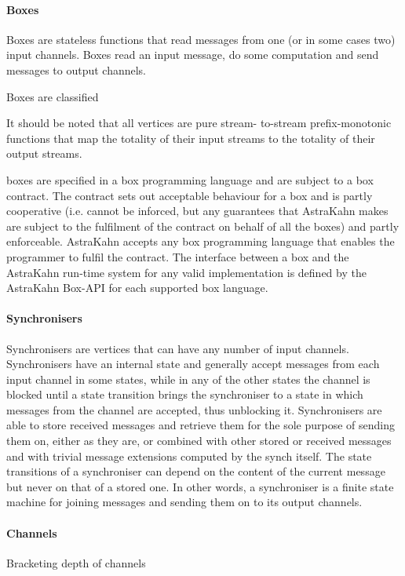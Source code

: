 \paragraph{Boxes}
Boxes are stateless functions that read messages from one (or in some cases two) input channels. Boxes read an input message, do some computation and send messages to output channels.

Boxes are classified

It should be noted that all vertices are pure stream- to-stream prefix-monotonic functions that map the totality of their input streams to the totality of their output streams.

boxes are specified in a
box programming language and are subject to a box contract. The contract sets out acceptable behaviour for a box and is partly cooperative (i.e. cannot be inforced, but any guarantees that AstraKahn makes are subject to the fulfilment of the contract on behalf of all the boxes) and partly enforceable. AstraKahn accepts any box programming language that enables the programmer to fulfil the contract. The interface between a box and the AstraKahn run-time system for any valid implementation is defined by the AstraKahn Box-API for each supported box language.



\paragraph{Synchronisers}
Synchronisers are vertices that can have any number of input channels. Synchronisers have an internal state and generally accept messages from each input channel in some states, while in any of the other states the channel is blocked until a state transition brings the synchroniser to a state in which messages from the channel are accepted, thus unblocking it. Synchronisers are able to store received messages and retrieve them for the sole purpose of sending them on, either as they are, or combined with other stored or received messages and with trivial message extensions computed by the synch itself. The state transitions of a synchroniser can depend on the content of the current message but never on that of a stored one. In other words, a synchroniser is a finite state machine for joining messages and sending them on to its output channels.


\paragraph{Channels}
Bracketing depth of channels

